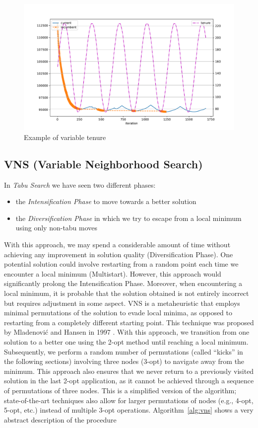\documentclass{article}
\begin{document}
\begin{figure}[ht]
        \caption{Example of variable tenure}
        \label{fig:sin_ten}
        \centering
        \includegraphics[width=400pt]{assets/sin_ten.pdf}
\end{figure}

\clearpage

\subsection{VNS (Variable Neighborhood Search)}
In \textit{Tabu Search} we have seen two different phases:
\begin{itemize}
        \item the \textit{Intensification Phase} to move towards a better solution
        \item the \textit{Diversification Phase} in which we try to escape from a local minimum using only
        non-tabu moves
\end{itemize}
With this approach, we may spend a considerable amount of time without achieving any improvement in
solution quality (Diversification Phase). One potential solution could involve restarting from a random
point each time we encounter a local minimum (Multistart). However, this approach would significantly
prolong the Intensification Phase. Moreover, when encountering a local minimum, it is probable
that the solution obtained is not entirely incorrect but requires adjustment in some aspect.
VNS is a metaheuristic that employs minimal permutations of the solution to evade local minima, as
opposed to restarting from a completely different starting point.
This technique was proposed by Mladenovi{\'c} and Hansen in 1997 \cite{mladenovic1997variable}.
With this approach, we transition from one solution to a better one using the 2-opt method until reaching
a local minimum. Subsequently, we perform a random number of permutations (called ``kicks'' in the following sections)
involving three nodes (3-opt) to navigate away from the minimum.
This approach also ensures that we never return to a previously visited
solution in the last 2-opt application, as it cannot be achieved through a sequence of permutations of
three nodes.
This is a simplified version of the algorithm; state-of-the-art techniques also allow for larger permutations
of nodes (e.g., 4-opt, 5-opt, etc.) instead of multiple 3-opt operations.
Algorithm~\ref{alg:vns} shows a very abstract description of the procedure
\end{document}

